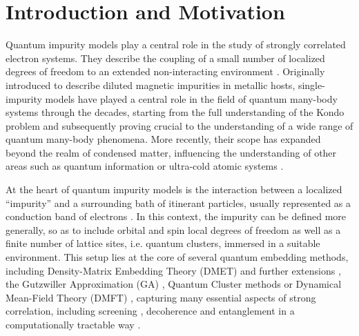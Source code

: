 \documentclass[edipack_sp.tex]{subfiles}
\begin{document}
\section{Introduction and Motivation}\label{SecIntro}
Quantum impurity models play a central role in the study of strongly correlated electron systems. They describe the coupling of a small number of localized degrees of freedom to an extended non-interacting environment \cite{Nozieres1980JP,Hewson1993}. 
Originally introduced to describe diluted magnetic impurities in metallic hosts, single-impurity models have played a central role in the field of quantum many-body systems through the decades, starting from the full understanding of the Kondo problem \cite{Anderson1961PR,Kondo1964POTP,Schrieffer1966PR} and subsequently proving crucial to the understanding of a wide range of quantum many-body phenomena\cite{Wilson1975RMP,Georges1996RMP,Kotliar2004PT,Kotliar2006RMP}. More recently, their scope has expanded beyond the realm of condensed matter, influencing the understanding of other areas such as quantum information \cite{Su2013MPLB,Walsh2019PRL,Walsh2020PQ,Walsh2021PNAS,Stocker2022,Bellomia2024PRB} or ultra-cold atomic systems \cite{Dao2007PRL,Amaricci2014PRA,Del-Re2018PRA,Walsh2019PRB,Tusi2022NP}.


At the heart of quantum impurity models is the interaction between a localized ``impurity''  and a surrounding bath of itinerant particles, usually represented as a conduction band of electrons \cite{Hewson1993}. In this context, the impurity  can be defined more generally, so as to include orbital and spin local degrees of freedom as well as a finite number of lattice sites, i.e. quantum clusters, immersed in a suitable environment. 
This setup lies at the core of several quantum embedding methods, including Density-Matrix Embedding Theory (DMET) \cite{Knizia2012PRL,Sun2020PRB} and further extensions \cite{Scott2021PRB,Nusspickel2022PRX}, the Gutzwiller Approximation (GA) \cite{Lanata2015PRX,Mejuto-Zaera2023PRB},
Quantum Cluster methods \cite{Potthoff2003TEPJBCMACS,Potthoff2011ACP,Dionne2023SPC,Dionne2023SPCa}
or Dynamical Mean-Field Theory (DMFT) \cite{Georges1996RMP, Kotliar2004PT,Kotliar2006RMP}, capturing many essential aspects of strong correlation, including screening \cite{Roekeghem2014PRL,Roekeghem2014EL,Werner2016JOPCM,Tomczak2017TEPJST}, decoherence and entanglement in a computationally tractable way \cite{Walsh2021PNAS,Bellomia2024PRB}. 
\end{document}

